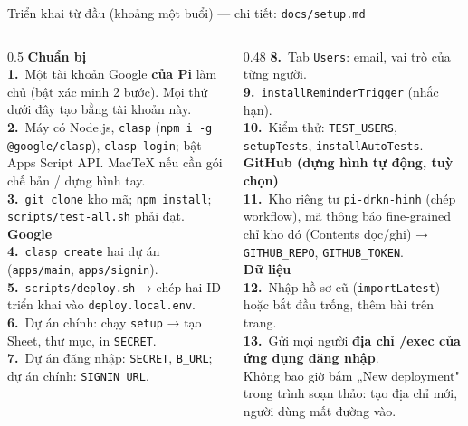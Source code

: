 \documentclass[aspectratio=169,11pt]{beamer}
\newcommand\sm[1]{{\fontsize{6.6}{8.2}\selectfont #1}}
\begin{document}
\begin{frame}{Triển khai từ đầu (khoảng một buổi) — chi tiết: \texttt{docs/setup.md}}
\begin{columns}[T]
\begin{column}{0.5\textwidth}\sm{%
\textbf{Chuẩn bị}\\
\textbf{1.}\ Một tài khoản Google \textbf{của Pi} làm chủ (bật xác minh 2 bước). Mọi thứ dưới đây tạo bằng tài khoản này.\\
\textbf{2.}\ Máy có Node.js, \texttt{clasp} (\texttt{npm i -g @google/clasp}), \texttt{clasp login}; bật Apps Script API.
MacTeX nếu cần gói chế bản / dựng hình tay.\\
\textbf{3.}\ \texttt{git clone} kho mã; \texttt{npm install}; \texttt{scripts/test-all.sh} phải đạt.\\[2mm]
\textbf{Google}\\
\textbf{4.}\ \texttt{clasp create} hai dự án (\texttt{apps/main}, \texttt{apps/signin}).\\
\textbf{5.}\ \texttt{scripts/deploy.sh} → chép hai ID triển khai vào \texttt{deploy.local.env}.\\
\textbf{6.}\ Dự án chính: chạy \texttt{setup} → tạo Sheet, thư mục, in \texttt{SECRET}.\\
\textbf{7.}\ Dự án đăng nhập: \texttt{SECRET}, \texttt{B\_URL}; dự án chính: \texttt{SIGNIN\_URL}.}
\end{column}
\begin{column}{0.48\textwidth}\sm{%
\textbf{8.}\ Tab \texttt{Users}: email, vai trò của từng người.\\
\textbf{9.}\ \texttt{installReminderTrigger} (nhắc hạn).\\
\textbf{10.}\ Kiểm thử: \texttt{TEST\_USERS}, \texttt{setupTests}, \texttt{installAutoTests}.\\[2mm]
\textbf{GitHub (dựng hình tự động, tuỳ chọn)}\\
\textbf{11.}\ Kho riêng tư \texttt{pi-drkn-hinh} (chép workflow), mã thông báo fine-grained chỉ kho đó (Contents đọc/ghi)
→ \texttt{GITHUB\_REPO}, \texttt{GITHUB\_TOKEN}.\\[2mm]
\textbf{Dữ liệu}\\
\textbf{12.}\ Nhập hồ sơ cũ (\texttt{importLatest}) hoặc bắt đầu trống, thêm bài trên trang.\\
\textbf{13.}\ Gửi mọi người \textbf{địa chỉ /exec của ứng dụng đăng nhập}.\\[2mm]
\textcolor{warn!80!black}{Không bao giờ bấm „New deployment" trong trình soạn thảo: tạo địa chỉ mới, người dùng mất đường vào.}}
\end{column}
\end{columns}
\end{frame}
\end{document}
